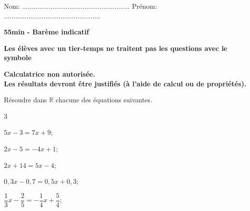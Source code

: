 \documentclass[11pt,a4paper]{article}  %
\begin{document}
	\graphicspath{{images/}}
	
	\noindent Nom: ${\scriptstyle  .........................................................}$ \hskip 1.8cm Prénom: ${\scriptstyle  ...................................................}$ 
	
	\vspace{.5cm}
	
	\begin{center}
		
		
	\end{center}

\begin{center}\textbf{55min - Barème indicatif}\end{center}
\begin{center}\textbf{Les élèves avec un tier-temps ne traitent pas les questions avec  le symbole }\end{center}
\begin{center}\textbf{Calculatrice non autorisée.\\Les résultats devront être justifiés (à l'aide de calcul ou de propriétés).}\end{center}




Résoudre dans $\mathbb{R}$ chacune des équations suivantes.
\begin{multicols}{3}
	\begin{enumMet}
		\item $5 x-3=7x+9$;
		\item {} $2 x-5=-4 x+1$;
		
		\columnbreak
		\item $2x+14=5x-4$;
		\item $0,3 x-0,7=0,5x+0,3$;
		
		\columnbreak
		\item $\dfrac{1}{3} x-\dfrac{2}{5}=-\dfrac{1}{4} x+\dfrac{5}{4}$;
	\end{enumMet}
\end{multicols}
\end{document}
